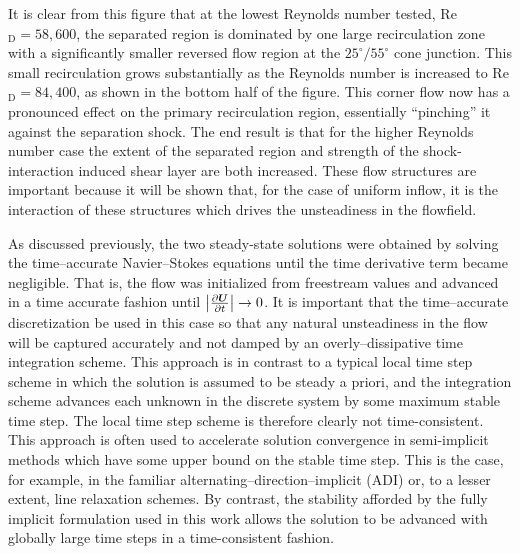It is clear from this figure that at the lowest Reynolds number tested, Re$_\text{D}=58,600$, the separated region is dominated by one large recirculation zone with a significantly smaller reversed flow region at the $25^\circ/55^\circ$ cone junction. This small recirculation grows substantially as the Reynolds number is increased to Re$_\text{D}=84,400$, as shown in the bottom half of the figure.  This corner flow now has a pronounced effect on the primary recirculation region, essentially ``pinching'' it against the separation shock.  The end result is that for the higher Reynolds number case the extent of the separated region and strength of the shock-interaction induced shear layer are both increased. These flow structures are important because it will be shown that, for the case of uniform inflow, it is the interaction of these structures which drives the unsteadiness in the flowfield.

As discussed previously, the two steady-state solutions were obtained by solving the time--accurate Navier--Stokes equations until the time derivative term became negligible.  That is, the flow was initialized from freestream values and advanced in a time accurate fashion until $\left|{\frac{\partial{{\boldsymbol{U}}}}{\partial{t}}}\right| \rightarrow 0$.  It is important that the time--accurate discretization be used in this case so that any natural unsteadiness in the flow will be captured accurately and not damped by an overly--dissipative time integration scheme.  This approach is in contrast to a typical local time step scheme in which the solution is assumed to be steady a priori, and the integration scheme advances each unknown in the discrete system by some maximum stable time step.  The local time step scheme is therefore clearly not time-consistent. This approach is often used to accelerate solution convergence in semi-implicit methods which have some upper bound on the stable time step.  This is the case, for example, in the familiar alternating--direction--implicit (ADI) or, to a lesser extent, line relaxation schemes.  By contrast, the stability afforded by the fully implicit formulation used in this work allows the solution to be advanced with globally large time steps in a time-consistent fashion.  

